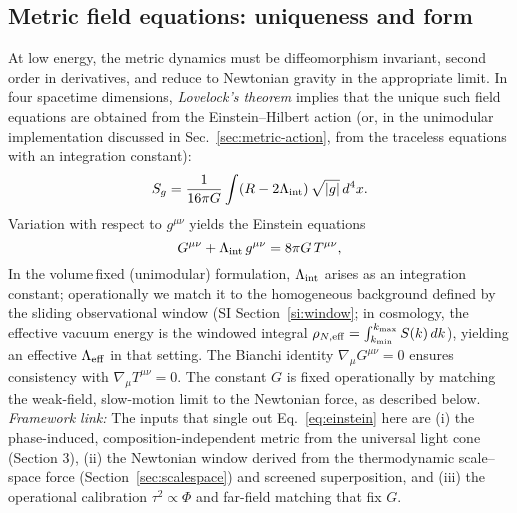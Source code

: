 \documentclass[11pt]{article}
\begin{document}
\subsection{Metric field equations: uniqueness and form}
At low energy, the metric dynamics must be diffeomorphism invariant, second order in derivatives, and reduce to Newtonian gravity in the appropriate limit. In four spacetime dimensions, \emph{Lovelock's theorem} implies that the unique such field equations are obtained from the Einstein--Hilbert action (or, in the unimodular implementation discussed in Sec.~\ref{sec:metric-action}, from the traceless equations with an integration constant):
\begin{equation}
  S_g = \frac{1}{16\pi G}\int (R - 2\Lambda_{\rm int})\,\sqrt{|g|}\,d^4x.
\end{equation}
Variation with respect to $g^{\mu\nu}$ yields the Einstein equations
\begin{equation}
  G^{\mu\nu} + \Lambda_{\rm int}\,g^{\mu\nu} = 8\pi G\,T^{\mu\nu},\label{eq:einstein}
\end{equation}
In the volume\,fixed (unimodular) formulation, $\Lambda_{\rm int}$ arises as an integration constant; operationally we match it to the homogeneous background defined by the sliding observational window (SI Section~\ref{si:window}; in cosmology, the effective vacuum energy is the windowed integral $\rho_{N,\rm eff}=\int_{k_{\min}}^{k_{\max}} S(k)\,dk$), yielding an effective $\Lambda_{\rm eff}$ in that setting.
The Bianchi identity $\nabla_\mu G^{\mu\nu}=0$ ensures consistency with $\nabla_\mu T^{\mu\nu}=0$. The constant $G$ is fixed operationally by matching the weak-field, slow-motion limit to the Newtonian force, as described below.
\noindent \emph{Framework link:} The inputs that single out Eq.~\eqref{eq:einstein} here are (i) the phase-induced, composition-independent metric from the universal light cone (Section 3), (ii) the Newtonian window derived from the thermodynamic scale--space force (Section~\ref{sec:scalespace}) and screened superposition, and (iii) the operational calibration $\tau^2\propto \Phi$ and far-field matching that fix $G$.
\end{document}
